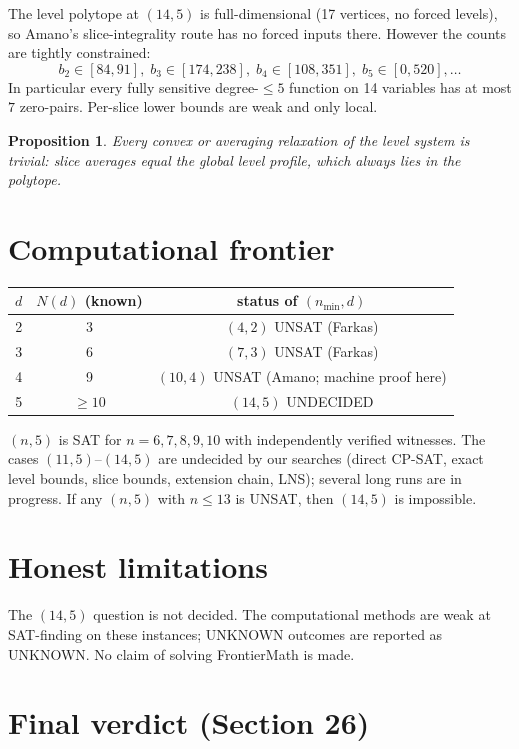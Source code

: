 \documentclass[11pt,a4paper]{article}
\newtheorem{proposition}{Proposition}
\theoremstyle{definition}
\theoremstyle{remark}
\begin{document}
The level polytope at $(14,5)$ is full-dimensional (17 vertices, no forced
levels), so Amano's slice-integrality route has no forced inputs there.
However the counts are tightly constrained:
\[
b_2\in[84,91],\; b_3\in[174,238],\; b_4\in[108,351],\; b_5\in[0,520],\dots
\]
In particular every fully sensitive degree-$\le5$ function on 14 variables has at
most $7$ zero-pairs.  Per-slice lower bounds are weak and only local.

\begin{proposition}
Every convex or averaging relaxation of the level system is trivial: slice
averages equal the global level profile, which always lies in the polytope.
\end{proposition}

\section{Computational frontier}
\label{sec:front}

\begin{center}
\begin{tabular}{c|c|c}
$d$ & $N(d)$ (known) & status of $(n_{\min},d)$ \\
\hline
2 & 3 & $(4,2)$ UNSAT (Farkas) \\
3 & 6 & $(7,3)$ UNSAT (Farkas) \\
4 & 9 & $(10,4)$ UNSAT (Amano; machine proof here) \\
5 & $\ge 10$ & $(14,5)$ UNDECIDED \\
\end{tabular}
\end{center}

$(n,5)$ is SAT for $n=6,7,8,9,10$ with independently verified witnesses.  The
cases $(11,5)$--$(14,5)$ are undecided by our searches (direct CP-SAT, exact
level bounds, slice bounds, extension chain, LNS); several long runs are in
progress.  If any $(n,5)$ with $n\le 13$ is UNSAT, then $(14,5)$ is impossible.

\section{Honest limitations}

The $(14,5)$ question is not decided.  The computational methods are weak at
SAT-finding on these instances; UNKNOWN outcomes are reported as UNKNOWN.  No
claim of solving FrontierMath is made.

\section{Final verdict (Section 26)}
\end{document}
